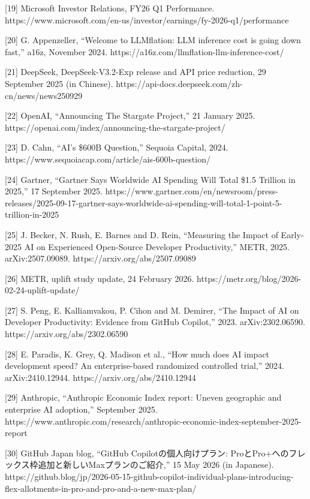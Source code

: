 \documentclass[
  10pt,
]{article}
\begin{document}
{[}19{]} Microsoft Investor Relations, FY26 Q1 Performance.
https://www.microsoft.com/en-us/investor/earnings/fy-2026-q1/performance

{[}20{]} G. Appenzeller, ``Welcome to LLMflation: LLM inference cost is
going down fast,'' a16z, November 2024.
https://a16z.com/llmflation-llm-inference-cost/

{[}21{]} DeepSeek, DeepSeek-V3.2-Exp release and API price reduction, 29
September 2025 (in Chinese).
https://api-docs.deepseek.com/zh-cn/news/news250929

{[}22{]} OpenAI, ``Announcing The Stargate Project,'' 21 January 2025.
https://openai.com/index/announcing-the-stargate-project/

{[}23{]} D. Cahn, ``AI's \$600B Question,'' Sequoia Capital, 2024.
https://www.sequoiacap.com/article/ais-600b-question/

{[}24{]} Gartner, ``Gartner Says Worldwide AI Spending Will Total \$1.5
Trillion in 2025,'' 17 September 2025.
https://www.gartner.com/en/newsroom/press-releases/2025-09-17-gartner-says-worldwide-ai-spending-will-total-1-point-5-trillion-in-2025

{[}25{]} J. Becker, N. Rush, E. Barnes and D. Rein, ``Measuring the
Impact of Early-2025 AI on Experienced Open-Source Developer
Productivity,'' METR, 2025. arXiv:2507.09089.
https://arxiv.org/abs/2507.09089

{[}26{]} METR, uplift study update, 24 February 2026.
https://metr.org/blog/2026-02-24-uplift-update/

{[}27{]} S. Peng, E. Kalliamvakou, P. Cihon and M. Demirer, ``The Impact
of AI on Developer Productivity: Evidence from GitHub Copilot,'' 2023.
arXiv:2302.06590. https://arxiv.org/abs/2302.06590

{[}28{]} E. Paradis, K. Grey, Q. Madison et al., ``How much does AI
impact development speed? An enterprise-based randomized controlled
trial,'' 2024. arXiv:2410.12944. https://arxiv.org/abs/2410.12944

{[}29{]} Anthropic, ``Anthropic Economic Index report: Uneven geographic
and enterprise AI adoption,'' September 2025.
https://www.anthropic.com/research/anthropic-economic-index-september-2025-report

{[}30{]} GitHub Japan blog, ``GitHub Copilotの個人向けプラン:
ProとPro+へのフレックス枠追加と新しいMaxプランのご紹介,'' 15 May 2026
(in Japanese).
https://github.blog/jp/2026-05-15-github-copilot-individual-plans-introducing-flex-allotments-in-pro-and-pro-and-a-new-max-plan/
\end{document}
